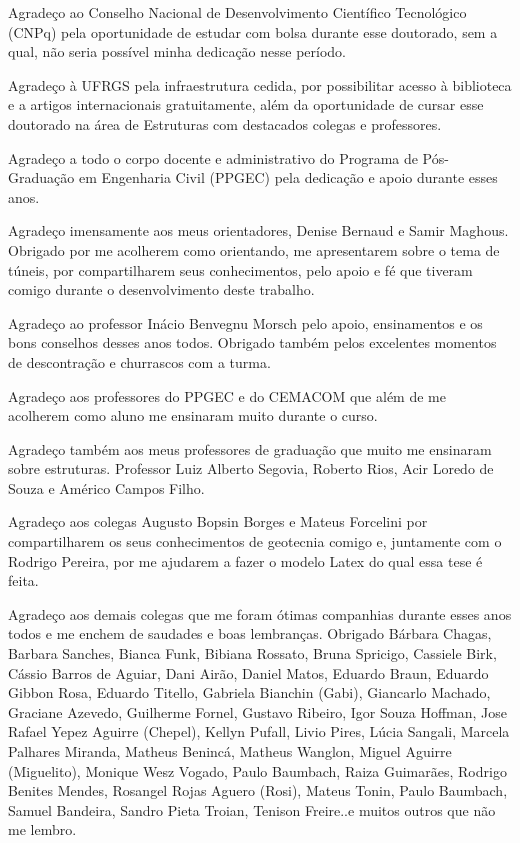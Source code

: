 Agradeço ao Conselho Nacional de Desenvolvimento Científico Tecnológico (CNPq) pela oportunidade de estudar com bolsa durante esse doutorado, sem a qual, não seria possível minha dedicação nesse período.

Agradeço à UFRGS pela infraestrutura cedida, por possibilitar acesso à biblioteca e a artigos internacionais gratuitamente, além da oportunidade de cursar esse doutorado na área de Estruturas com destacados colegas e professores.

Agradeço a todo o corpo docente e administrativo do Programa de Pós-Graduação em Engenharia Civil (PPGEC) pela dedicação e apoio durante esses anos.

Agradeço imensamente aos meus orientadores, Denise Bernaud e Samir Maghous. Obrigado por me acolherem como orientando, me apresentarem sobre o tema de túneis, por compartilharem seus conhecimentos, pelo apoio e fé que tiveram comigo durante o desenvolvimento deste trabalho.

Agradeço ao professor Inácio Benvegnu Morsch pelo apoio, ensinamentos e os bons conselhos desses anos todos. Obrigado também pelos excelentes momentos de descontração e churrascos com a turma.

Agradeço aos professores do PPGEC e do CEMACOM que além de me acolherem como aluno me ensinaram muito durante o curso.

Agradeço também aos meus professores de graduação que muito me ensinaram sobre estruturas. Professor Luiz Alberto Segovia, Roberto Rios, Acir Loredo de Souza e Américo Campos Filho.

Agradeço aos colegas Augusto Bopsin Borges e Mateus Forcelini por compartilharem os seus conhecimentos de geotecnia comigo e, juntamente com o Rodrigo Pereira, por me ajudarem a fazer o modelo Latex do qual essa tese é feita.

Agradeço aos demais colegas que me foram ótimas companhias durante esses anos todos e me enchem de saudades e boas lembranças. Obrigado Bárbara Chagas, Barbara Sanches, Bianca Funk, Bibiana Rossato, Bruna Spricigo, Cassiele Birk, Cássio Barros de Aguiar, Dani Airão, Daniel Matos, Eduardo Braun, Eduardo Gibbon Rosa, Eduardo Titello, Gabriela Bianchin (Gabi), Giancarlo Machado, Graciane Azevedo, Guilherme Fornel, Gustavo Ribeiro, Igor Souza Hoffman, Jose Rafael Yepez Aguirre (Chepel), Kellyn Pufall, Livio Pires, Lúcia Sangali, Marcela Palhares Miranda, Matheus Benincá, Matheus Wanglon, Miguel Aguirre (Miguelito), Monique Wesz Vogado, Paulo Baumbach, Raiza Guimarães, Rodrigo Benites Mendes, Rosangel Rojas Aguero (Rosi), Mateus Tonin, Paulo Baumbach, Samuel Bandeira, Sandro Pieta Troian, Tenison Freire..e muitos outros que não me lembro.

